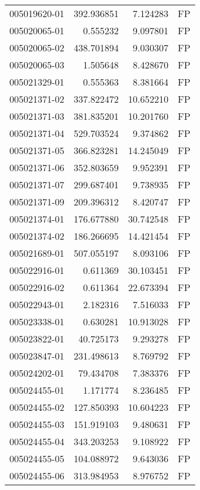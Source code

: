 \begin{tabular}{lrrl}
005019620-01 &  392.936851 &       7.124283 &   FP \\
005020065-01 &    0.555232 &       9.097801 &   FP \\
005020065-02 &  438.701894 &       9.030307 &   FP \\
005020065-03 &    1.505648 &       8.428670 &   FP \\
005021329-01 &    0.555363 &       8.381664 &   FP \\
005021371-02 &  337.822472 &      10.652210 &   FP \\
005021371-03 &  381.835201 &      10.201760 &   FP \\
005021371-04 &  529.703524 &       9.374862 &   FP \\
005021371-05 &  366.823281 &      14.245049 &   FP \\
005021371-06 &  352.803659 &       9.952391 &   FP \\
005021371-07 &  299.687401 &       9.738935 &   FP \\
005021371-09 &  209.396312 &       8.420747 &   FP \\
005021374-01 &  176.677880 &      30.742548 &   FP \\
005021374-02 &  186.266695 &      14.421454 &   FP \\
005021689-01 &  507.055197 &       8.093106 &   FP \\
005022916-01 &    0.611369 &      30.103451 &   FP \\
005022916-02 &    0.611364 &      22.673394 &   FP \\
005022943-01 &    2.182316 &       7.516033 &   FP \\
005023338-01 &    0.630281 &      10.913028 &   FP \\
005023822-01 &   40.725173 &       9.293278 &   FP \\
005023847-01 &  231.498613 &       8.769792 &   FP \\
005024202-01 &   79.434708 &       7.383376 &   FP \\
005024455-01 &    1.171774 &       8.236485 &   FP \\
005024455-02 &  127.850393 &      10.604223 &   FP \\
005024455-03 &  151.919103 &       9.480631 &   FP \\
005024455-04 &  343.203253 &       9.108922 &   FP \\
005024455-05 &  104.088972 &       9.643036 &   FP \\
005024455-06 &  313.984953 &       8.976752 &   FP \\

\end{tabular}
